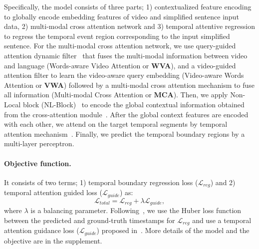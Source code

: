 Specifically, the model consists of three parts; 1) contextualized feature encoding to globally encode embedding features of video and simplified sentence input data, 2) multi-modal cross attention network and 3) temporal attentive regression to regress the temporal event region corresponding to the input simplified sentence. 
For the multi-modal cross attention network, we use query-guided attention dynamic filter~\cite{Zhang_2019_CVPR, opazo2019proposal} that fuses the multi-modal information between video and language (Words-aware Video Attention or \textbf{WVA}), and a video-guided attention filter to learn the video-aware query embedding (Video-aware Words Attention or \textbf{VWA}) followed by a multi-modal cross attention mechanism to fuse all information (Multi-modal Cross Attention or \textbf{MCA}). 
Then, we apply Non-Local block (NL-Block)~\cite{nonlocalnet} to encode the global contextual information obtained from the cross-attention module~\cite{mun2020LGI}. 
After the global context features are encoded with each other, we attend on the target temporal segments by temporal attention mechanism~\cite{opazo2019proposal,mun2020LGI}.
Finally, we predict the temporal boundary regions by a multi-layer perceptron.

\vspace{-1em}\paragraph{Objective function.} 
It consists of two terms; 1) temporal boundary regression loss ($\mathcal{L}_{reg}$) and 2) temporal attention guided loss ($\mathcal{L}_{guide}$) as:
\begin{equation}
    \mathcal{L}_{total} = \mathcal{L}_{reg} + \lambda \mathcal{L}_{guide},
    \label{eq:loss}
\end{equation}
where $\lambda$ is a balancing parameter.
Following~\cite{mun2020LGI}, we use the Huber loss function~\cite{huber} between the predicted and ground-truth timestamps for $\mathcal{L}_{reg}$ and use a temporal attention guidance loss ($\mathcal{L}_{guide}$) proposed in~\cite{opazo2019proposal, mun2020LGI}.
More details of the model and the objective are in the supplement.

